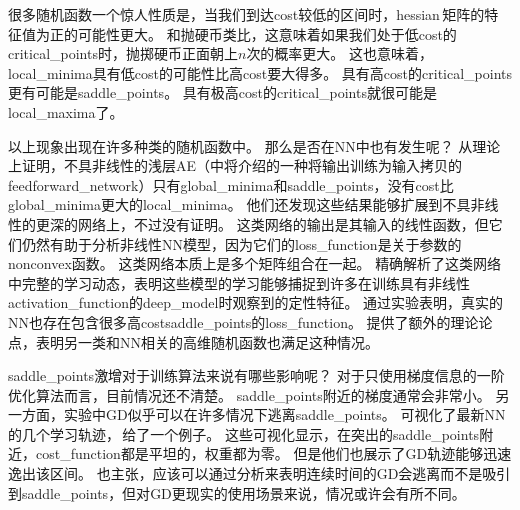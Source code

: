 很多随机函数一个惊人性质是，当我们到达\gls{cost}较低的区间时，\gls{hessian}\,矩阵的特征值为正的可能性更大。
和抛硬币类比，这意味着如果我们处于低\gls{cost}的\gls{critical_points}时，抛掷硬币正面朝上$n$次的概率更大。
这也意味着，\gls{local_minima}具有低\gls{cost}的可能性比高\gls{cost}要大得多。
具有高\gls{cost}的\gls{critical_points}更有可能是\gls{saddle_points}。
具有极高\gls{cost}的\gls{critical_points}就很可能是\gls{local_maxima}了。


以上现象出现在许多种类的随机函数中。
那么是否在\gls{NN}中也有发生呢？
\cite{Baldi-Hornik-1989}从理论上证明，不具非线性的浅层\gls{AE}（中将介绍的一种将输出训练为输入拷贝的\gls{feedforward_network}）只有\gls{global_minima}和\gls{saddle_points}，没有\gls{cost}比\gls{global_minima}更大的\gls{local_minima}。
他们还发现这些结果能够扩展到不具非线性的更深的网络上，不过没有证明。
这类网络的输出是其输入的线性函数，但它们仍然有助于分析非线性\gls{NN}模型，因为它们的\gls{loss_function}是关于参数的\gls{nonconvex}函数。
这类网络本质上是多个矩阵组合在一起。
\cite{Saxe-et-al-2013}精确解析了这类网络中完整的学习动态，表明这些模型的学习能够捕捉到许多在训练具有非线性\gls{activation_function}的\gls{deep_model}时观察到的定性特征。
\cite{Dauphin-et-al-2014}通过实验表明，真实的\gls{NN}也存在包含很多高\gls{cost}\gls{saddle_points}的\gls{loss_function}。
\cite{Choromanska-et-al-2014}提供了额外的理论论点，表明另一类和\gls{NN}相关的高维随机函数也满足这种情况。


\gls{saddle_points}激增对于训练算法来说有哪些影响呢？
对于只使用梯度信息的一阶优化算法而言，目前情况还不清楚。
\gls{saddle_points}附近的梯度通常会非常小。
另一方面，实验中\gls{GD}似乎可以在许多情况下逃离\gls{saddle_points}。
\cite{Goodfellow-et-al-2015}可视化了最新\gls{NN}的几个学习轨迹，\,给了一个例子。
这些可视化显示，在突出的\gls{saddle_points}附近，\gls{cost_function}都是平坦的，权重都为零。
但是他们也展示了\gls{GD}轨迹能够迅速逸出该区间。
\cite{Goodfellow-et-al-2015}也主张，应该可以通过分析来表明连续时间的\gls{GD}会逃离而不是吸引到\gls{saddle_points}，但对\gls{GD}更现实的使用场景来说，情况或许会有所不同。



